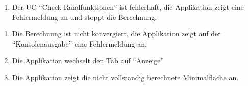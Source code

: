 \begin{itemize}
\begin{enumerate}[label=(3a\arabic*)]
  \item Der UC "`Check Randfunktionen"' ist fehlerhaft, die Applikation zeigt eine Fehlermeldung an und stoppt die Berechnung.
    \end{enumerate}
    \begin{enumerate}[label=(7a\arabic*)]
    \item Die Berechnung ist nicht konvergiert, die Applikation zeigt auf der "`Konsolenausgabe"' eine Fehlermeldung an.
     \item Die Applikation wechselt den Tab auf "`Anzeige"'
     \item Die Applikation zeigt die nicht vollst\"andig berechnete Minimalfl\"ache an.
        \end{enumerate}
  \end{itemize}